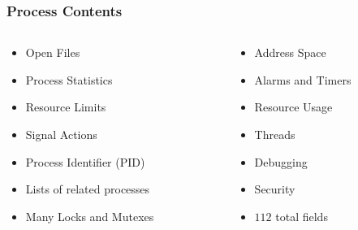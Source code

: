 \documentclass[pdftex]{beamer} %
\begin{document}
\begin{frame}
  \frametitle{Process Contents}
\begin{columns}[t]
    \begin{column}{5cm}
      \begin{itemize}
      \item Open Files
      \item Process Statistics
      \item Resource Limits
      \item Signal Actions
      \item Process Identifier (PID)
      \item Lists of related processes
      \item Many Locks and Mutexes
      \end{itemize}
    \end{column}
    \begin{column}{5cm}
      \begin{itemize}
      \item Address Space
      \item Alarms and Timers
      \item Resource Usage
      \item Threads
      \item Debugging 
      \item Security
      \item $112$ total fields
      \end{itemize}
    \end{column}
  \end{columns}
\end{frame}
\end{document}
